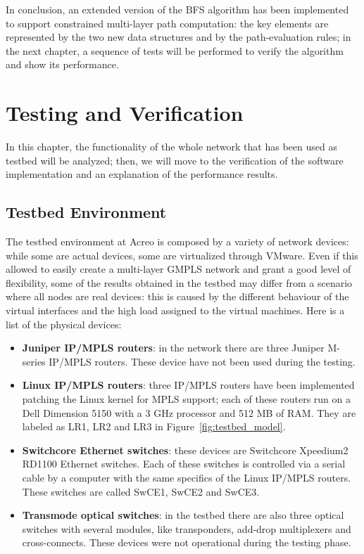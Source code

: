 \documentclass[10pt,a4paper]{report}
\begin{document}
In conclusion, an extended version of the BFS algorithm has been
implemented to support constrained multi-layer path computation: the
key elements are represented by the two new data structures and by the
path-evaluation rules; in the next chapter, a sequence of tests will
be performed to verify the algorithm and show its performance.

\chapter{Testing and Verification}\label{sec:test}
 
In this chapter, the functionality of the whole network that has been
used as testbed will be analyzed; then, we will move to the
verification of the software implementation and an explanation of the
performance results.
 
\section{Testbed Environment}
 
The testbed environment at Acreo is composed by a variety of network
devices: while some are actual devices, some are virtualized through
VMware. Even if this allowed to easily create a multi-layer GMPLS
network and grant a good level of flexibility, some of the results
obtained in the testbed may differ from a scenario where all nodes are
real devices: this is caused by the different behaviour of the virtual
interfaces and the high load assigned to the virtual machines. Here is
a list of the physical devices:
\begin{itemize}
\item \textbf{Juniper IP/MPLS routers}: in the network there are three
  Juniper M-series IP/MPLS routers. These device have not been used
  during the testing.
\item \textbf{Linux IP/MPLS routers}: three IP/MPLS routers have been
  implemented patching the Linux kernel for MPLS support; each of
  these routers run on a Dell Dimension 5150 with a 3 GHz processor
  and 512 MB of RAM\@. They are labeled as LR1, LR2 and LR3 in
  Figure~\ref{fig:testbed_model}.
\item \textbf{Switchcore Ethernet switches}: these devices are
  Switchcore Xpeedium2 RD1100 Ethernet switches. Each of these
  switches is controlled via a serial cable by a computer with the
  same specifics of the Linux IP/MPLS routers. These switches are
  called SwCE1, SwCE2 and SwCE3.
\item \textbf{Transmode optical switches}: in the testbed there are
  also three optical switches with several modules, like transponders,
  add-drop multiplexers and cross-connects. These devices were not
  operational during the testing phase.
\end{itemize}
 
\end{document}
